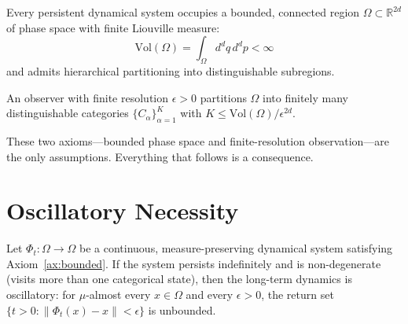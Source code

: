 \begin{axiom}
\label{ax:bounded}
Every persistent dynamical system occupies a bounded, connected region $\Omega \subset \mathbb{R}^{2d}$ of phase space with finite Liouville measure:
\begin{equation}
    \mathrm{Vol}(\Omega) = \int_\Omega d^d q\, d^d p < \infty
\end{equation}
and admits hierarchical partitioning into distinguishable subregions.
\end{axiom}

\begin{axiom}
\label{ax:categorical}
An observer with finite resolution $\epsilon > 0$ partitions $\Omega$ into finitely many distinguishable categories $\{C_\alpha\}_{\alpha=1}^{K}$ with $K \leq \mathrm{Vol}(\Omega)/\epsilon^{2d}$.
\end{axiom}

\begin{remark}
These two axioms---bounded phase space and finite-resolution observation---are the only assumptions. Everything that follows is a consequence.
\end{remark}

\section{Oscillatory Necessity}
\label{sec:oscillatory}

\begin{theorem}
\label{thm:oscillatory}
Let $\Phi_t : \Omega \to \Omega$ be a continuous, measure-preserving dynamical system satisfying Axiom~\ref{ax:bounded}. If the system persists indefinitely and is non-degenerate (visits more than one categorical state), then the long-term dynamics is oscillatory: for $\mu$-almost every $x \in \Omega$ and every $\epsilon > 0$, the return set $\{t > 0 : \|\Phi_t(x) - x\| < \epsilon\}$ is unbounded.
\end{theorem}

